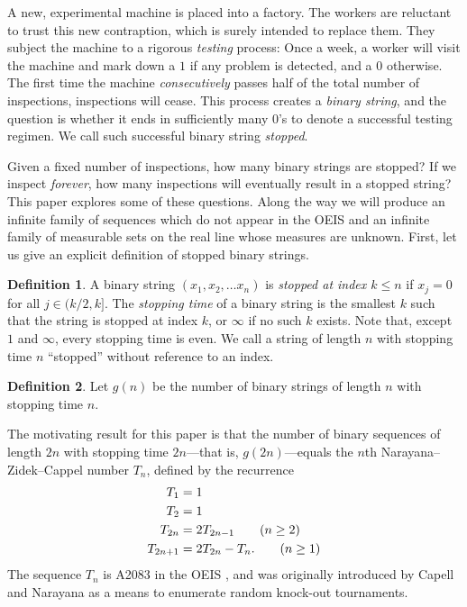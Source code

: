 \documentclass[12pt]{article}
\theoremstyle{definition}
\newtheorem{definition}{Definition}
\begin{document}
\noindent A new, experimental machine is placed into a factory. The workers are
reluctant to trust this new contraption, which is surely intended to replace
them. They subject the machine to a rigorous \emph{testing} process: Once a
week, a worker will visit the machine and mark down a $1$ if any problem is
detected, and a $0$ otherwise. The first time the machine \emph{consecutively}
passes half of the total number of inspections, inspections will cease. This
process creates a \emph{binary string}, and the question is whether it ends in
sufficiently many $0$'s to denote a successful testing regimen. We call such
successful binary string \emph{stopped}.

Given a fixed number of inspections, how many binary strings are stopped? If we
inspect \emph{forever}, how many inspections will eventually result in a
stopped string? This paper explores some of these questions. Along the way we
will produce an infinite family of sequences which do not appear in the OEIS
and an infinite family of measurable sets on the real line whose measures are
unknown. First, let us give an explicit definition of stopped binary strings.

\begin{definition}
    A binary string $(x_1, x_2, \dots x_n)$ is \emph{stopped at index $k \leq
    n$} if $x_j = 0$ for all $j \in (k / 2, k]$. The \emph{stopping time} of a
    binary string is the smallest $k$ such that the string is stopped at index
    $k$, or $\infty$ if no such $k$ exists. Note that, except $1$ and $\infty$,
    every stopping time is even. We call a string of length $n$ with stopping
    time $n$ ``stopped'' without reference to an index.
\end{definition}

\begin{definition}
    Let $g(n)$ be the number of binary strings of length $n$ with stopping time
    $n$. 
\end{definition}

The motivating result for this paper is that the number of binary sequences of
length $2n$ with stopping time $2n$---that is, $g(2n)$---equals the $n$th
Narayana--Zidek--Cappel number $T_n$, defined by the recurrence
\begin{align}
    T_1 &= 1 \notag \\
    T_2 &= 1 \notag \\
    T_{2n} &= 2 T_{2n - 1} \tag{$n \geq 2$} \\
    T_{2n + 1} &= 2 T_{2n} - T_n. \tag{$n \geq 1$}
\end{align}
The sequence $T_n$ is A2083 in the OEIS \cite{oeis}, and was originally
introduced by Capell and Narayana \cite{capell1970knock,
narayana1969tournaments, narayana1979tournaments} as a means to enumerate
random knock-out tournaments.
\end{document}
